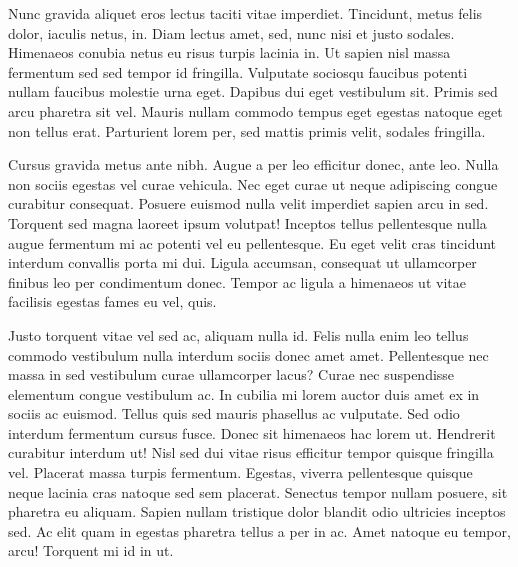 \documentclass[
  letterpaper,
  DIV=11,
  numbers=noendperiod]{scrartcl}
\begin{document}
Nunc gravida aliquet eros lectus taciti vitae imperdiet. Tincidunt,
metus felis dolor, iaculis netus, in. Diam lectus amet, sed, nunc nisi
et justo sodales. Himenaeos conubia netus eu risus turpis lacinia in. Ut
sapien nisl massa fermentum sed sed tempor id fringilla. Vulputate
sociosqu faucibus potenti nullam faucibus molestie urna eget. Dapibus
dui eget vestibulum sit. Primis sed arcu pharetra sit vel. Mauris nullam
commodo tempus eget egestas natoque eget non tellus erat. Parturient
lorem per, sed mattis primis velit, sodales fringilla.

Cursus gravida metus ante nibh. Augue a per leo efficitur donec, ante
leo. Nulla non sociis egestas vel curae vehicula. Nec eget curae ut
neque adipiscing congue curabitur consequat. Posuere euismod nulla velit
imperdiet sapien arcu in sed. Torquent sed magna laoreet ipsum volutpat!
Inceptos tellus pellentesque nulla augue fermentum mi ac potenti vel eu
pellentesque. Eu eget velit cras tincidunt interdum convallis porta mi
dui. Ligula accumsan, consequat ut ullamcorper finibus leo per
condimentum donec. Tempor ac ligula a himenaeos ut vitae facilisis
egestas fames eu vel, quis.

Justo torquent vitae vel sed ac, aliquam nulla id. Felis nulla enim leo
tellus commodo vestibulum nulla interdum sociis donec amet amet.
Pellentesque nec massa in sed vestibulum curae ullamcorper lacus? Curae
nec suspendisse elementum congue vestibulum ac. In cubilia mi lorem
auctor duis amet ex in sociis ac euismod. Tellus quis sed mauris
phasellus ac vulputate. Sed odio interdum fermentum cursus fusce. Donec
sit himenaeos hac lorem ut. Hendrerit curabitur interdum ut! Nisl sed
dui vitae risus efficitur tempor quisque fringilla vel. Placerat massa
turpis fermentum. Egestas, viverra pellentesque quisque neque lacinia
cras natoque sed sem placerat. Senectus tempor nullam posuere, sit
pharetra eu aliquam. Sapien nullam tristique dolor blandit odio
ultricies inceptos sed. Ac elit quam in egestas pharetra tellus a per in
ac. Amet natoque eu tempor, arcu! Torquent mi id in ut.
\end{document}
